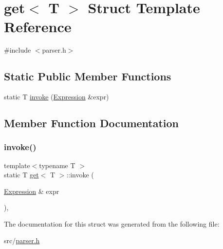 \hypertarget{structget}{}\section{get$<$ T $>$ Struct Template Reference}
\label{structget}


{\ttfamily \#include $<$parser.\+h$>$}

\subsection*{Static Public Member Functions}
\begin{DoxyCompactItemize}
\item 
static T \hyperlink{structget_ad8f79571adbbce029d5eebdee08108af}{invoke} (\hyperlink{ast_8h_a4cb273a4d960cd13ea17d08f254493e8}{Expression} \&expr)
\end{DoxyCompactItemize}


\subsection{Member Function Documentation}
\mbox{\label{structget_ad8f79571adbbce029d5eebdee08108af}} 
\subsubsection{\texorpdfstring{invoke()}{invoke()}}
{\footnotesize\ttfamily template$<$typename T $>$ \\
static T \hyperlink{structget}{get}$<$ T $>$\+::invoke (\begin{DoxyParamCaption}\item[{\hyperlink{ast_8h_a4cb273a4d960cd13ea17d08f254493e8}{Expression} \&}]{expr }\end{DoxyParamCaption})\hspace{0.3cm}{\ttfamily [inline]}, {\ttfamily [static]}}



The documentation for this struct was generated from the following file\+:\begin{DoxyCompactItemize}
\item 
src/\hyperlink{parser_8h}{parser.\+h}\end{DoxyCompactItemize}
